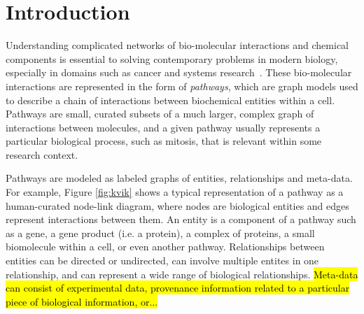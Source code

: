 




\maketitle


\section{Introduction}

Understanding complicated networks of bio-molecular interactions and chemical components is essential to solving contemporary problems in modern biology, especially in domains such as cancer and systems research~\cite{hanahan2011hallmarks}.
These bio-molecular interactions are represented in the form of \emph{pathways}, which are graph models used to describe a chain of interactions between biochemical entities within a cell.
Pathways are small, curated subsets of a much larger, complex graph of interactions between molecules, and a given pathway usually represents a particular biological process, such as mitosis, that is relevant within some research context.

Pathways are modeled as labeled graphs of entities, relationships and meta-data.
For example, Figure \ref{fig:kvik} shows a typical representation of a pathway as a human-curated node-link diagram, where nodes are biological entities and edges represent interactions between them.
An entity is a component of a pathway such as a gene, a gene product (i.e. a protein), a complex of proteins, a small biomolecule within a cell, or even another pathway.
Relationships between entities can be directed or undirected, can involve multiple entites in one relationship, and can represent a wide range of biological relationships.
\hl{Meta-data can consist of experimental data, provenance information related to a particular piece of biological information, or...}

